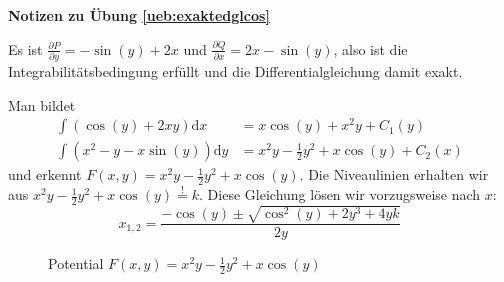 \documentclass[%
11pt,%
twoside,%
titlepage,%
swissgerman,%
headsepline%
]{scrartcl}
\newcommand{\faReturnGray}{\textcolor{gray}{\faMailReply}} %
\theoremstyle{definition}
\theoremstyle{plain}
\newcommand{\concatueb}[1]{ueb:#1}%
\newcommand{\concatlsg}[1]{lsg:#1}%
\newenvironment{lsg}[1]{%
    \par\noindent\textbf{Notizen zu Übung \ref{\concatueb{#1}}}\label{\concatlsg{#1}}
    \hfill\hyperref[\concatueb{#1}]{\faReturnGray}\par %
}{%
    \par%
}
\begin{document}
\begin{lsg}{exaktedglcos}
    Es ist $\frac{\partial P}{\partial y} = -\sin(y)+2x$ und $\frac{\partial Q}{\partial x} = 2x-\sin(y)$, also ist die Integrabilitätsbedingung erfüllt und die Differentialgleichung damit exakt.

    Man bildet
    \begin{align*}
        \int (\cos(y)+2xy)\mathrm{d}x &= x\cos(y)+x^2y+C_1(y)\\
        \int (x^2-y-x\sin(y))\mathrm{d}y &= x^2y-\frac{1}{2}y^2+x\cos(y)+C_2(x)
    \end{align*}
    und erkennt $F(x,y)=x^2y-\frac{1}{2}y^2+x\cos(y)$. Die Niveaulinien erhalten wir aus $x^2y-\frac{1}{2}y^2+x\cos(y)\stackrel{!}{=}k$. Diese Gleichung lösen wir vorzugsweise nach $x$:
    $$x_{1,2}=\frac{-\cos(y)\pm\sqrt{\cos^2(y)+2y^3+4yk}}{2y}$$

    \begin{figure}[h]
    \centering
    \caption{Potential $F(x,y)=x^2y-\frac{1}{2}y^2+x\cos(y)$}
\end{figure}
\end{lsg}
\end{document}

